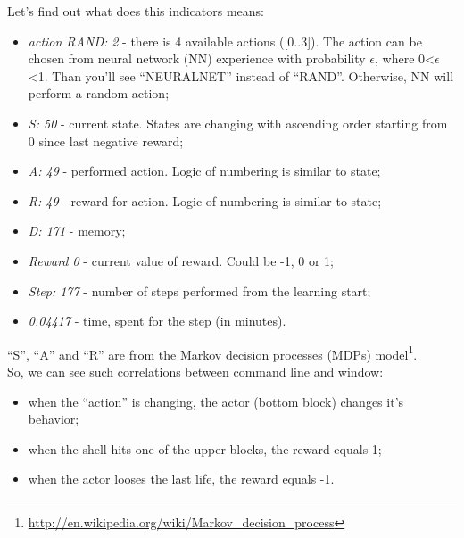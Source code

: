 \documentclass[a4paper,oneside,dvipsnames]{article}
\begin{document}
Let's find out what does this indicators means:
\begin{itemize}
    \item \textit{action RAND: 2} - there is 4 available actions ([0..3]). The action can be chosen from neural network (NN) experience with probability $\epsilon$, where 0<$\epsilon$<1. Than you'll see ``NEURALNET'' instead of ``RAND''. Otherwise, NN will perform a random action;
    \item \textit{S: 50} - current state. States are changing with ascending order starting from 0 since last negative reward;
    \item \textit{A: 49} - performed action. Logic of numbering is similar to state;
    \item \textit{R: 49} - reward for action. Logic of numbering is similar to state;
    \item \textit{D: 171} - memory;
    \item \textit{Reward 0} - current value of reward. Could be -1, 0 or 1;
    \item \textit{Step: 177} - number of steps performed from the learning start;
    \item \textit{0.04417} - time, spent for the step (in minutes).
\end{itemize}

\noindent
``S'', ``A'' and ``R'' are from the Markov decision processes (MDPs) model\footnote{\url{http://en.wikipedia.org/wiki/Markov_decision_process}}. \\
\noindent
So, we can see such correlations between command line and window:
\begin{itemize}
    \item when the ``action'' is changing, the actor (bottom block) changes it's behavior;
    \item when the shell hits one of the upper blocks, the reward equals 1;
    \item when the actor looses the last life, the reward equals -1.
\end{itemize}
\end{document}
